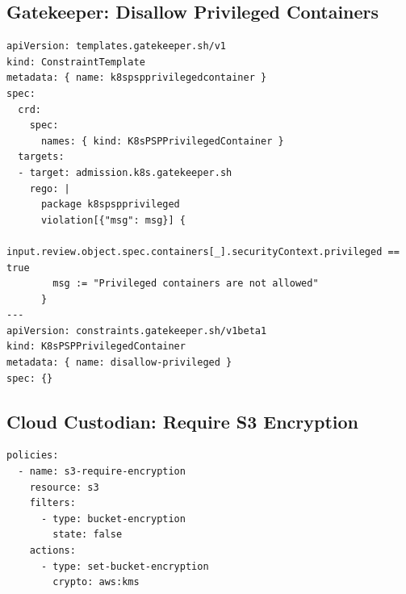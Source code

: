 \documentclass[11pt]{article}
\begin{document}
\subsection{Gatekeeper: Disallow Privileged Containers}
\par
\begin{verbatim}
apiVersion: templates.gatekeeper.sh/v1
kind: ConstraintTemplate
metadata: { name: k8spspprivilegedcontainer }
spec:
  crd:
    spec:
      names: { kind: K8sPSPPrivilegedContainer }
  targets:
  - target: admission.k8s.gatekeeper.sh
    rego: |
      package k8spspprivileged
      violation[{"msg": msg}] {
        input.review.object.spec.containers[_].securityContext.privileged == true
        msg := "Privileged containers are not allowed"
      }
---
apiVersion: constraints.gatekeeper.sh/v1beta1
kind: K8sPSPPrivilegedContainer
metadata: { name: disallow-privileged }
spec: {}
\end{verbatim}

\subsection{Cloud Custodian: Require S3 Encryption}
\par
\begin{verbatim}
policies:
  - name: s3-require-encryption
    resource: s3
    filters:
      - type: bucket-encryption
        state: false
    actions:
      - type: set-bucket-encryption
        crypto: aws:kms
\end{verbatim}
\end{document}
